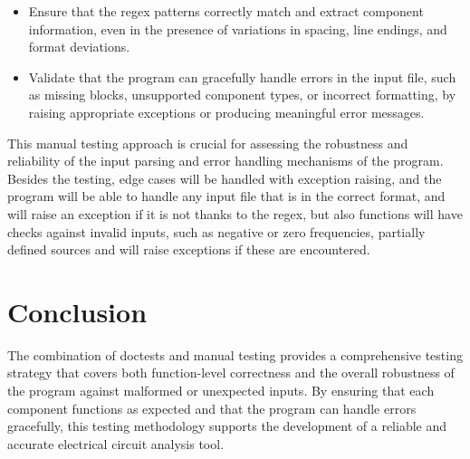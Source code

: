 \documentclass[conference]{IEEEtran}
\begin{document}
\begin{itemize}
    \item Ensure that the regex patterns correctly match and extract component information, even in the presence of variations in spacing, line endings, and format deviations.
    \item Validate that the program can gracefully handle errors in the input file, such as missing blocks, unsupported component types, or incorrect formatting, by raising appropriate exceptions or producing meaningful error messages.
\end{itemize}

This manual testing approach is crucial for assessing the robustness and reliability of the input parsing and error handling mechanisms of the program.\\

Besides the testing, edge cases will be handled with exception raising, and the program will be able to handle any input file that is in the correct format, and will raise an exception if it is not thanks to the regex, but also functions will
have checks against invalid inputs, such as negative or zero frequencies, partially defined sources and will raise exceptions if these are encountered.

\section{Conclusion}
The combination of doctests and manual testing provides a comprehensive testing strategy that
 covers both function-level correctness and the overall robustness of the 
 program against malformed or unexpected inputs. By ensuring that each component 
 functions as expected and that the program can handle errors gracefully, this 
 testing methodology supports the development of a reliable and accurate
  electrical circuit analysis tool.
\end{document}
